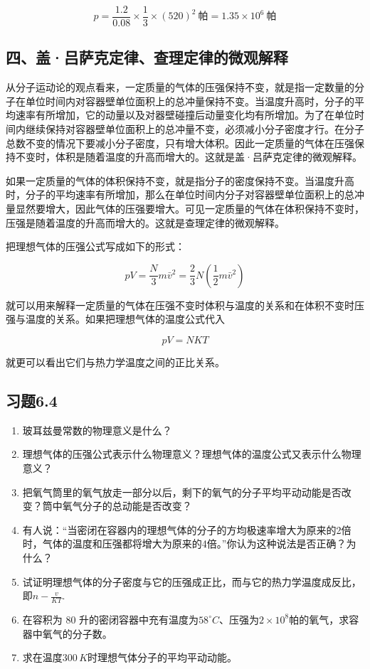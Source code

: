 \[
p=\frac{1.2}{0.08}\times\frac13\times(520)^2\ \text{帕}=1.35\times10^6\ \text{帕}
\]

\subsection{四、盖·吕萨克定律、查理定律的微观解释}\label{ux56dbux76d6ux5415ux8428ux514bux5b9aux5f8bux67e5ux7406ux5b9aux5f8bux7684ux5faeux89c2ux89e3ux91ca}

从分子运动论的观点看来，一定质量的气体的压强保持不变，就是指一定数量的分子在单位时间内对容器壁单位面积上的总冲量保持不变。当温度升高时，分子的平均速率有所增加，它的动量以及对器壁碰撞后动量变化均有所增加。为了在单位时间内继续保持对容器壁单位面积上的总冲量不变，必须减小分子密度才行。在分子总数不变的情况下要减小分子密度，只有增大体积。因此一定质量的气体在压强保持不变时，体积是随着温度的升高而增大的。这就是盖·吕萨克定律的微观解释。

如果一定质量的气体的体积保持不变，就是指分子的密度保持不变。当温度升高时，分子的平均速率有所增加，那么在单位时间内分子对容器壁单位面积上的总冲量显然要增大，因此气体的压强要增大。可见一定质量的气体在体积保持不变时，压强是随着温度的升高而增大的。这就是查理定律的微观解释。

把理想气体的压强公式写成如下的形式：

\[
p V = \frac {N}{3} m \bar {v} ^ {2} = \frac {2}{3} N \left(\frac {1}{2} m \bar {v} ^ {2}\right)
\]

就可以用来解释一定质量的气体在压强不变时体积与温度的关系和在体积不变时压强与温度的关系。如果把理想气体的温度公式代入

\[
p V = N K T
\]

就更可以看出它们与热力学温度之间的正比关系。

\subsection{习题6.4}\label{ux4e60ux98986.4}

\begin{enumerate}
\def\labelenumi{\arabic{enumi}.}
\item
  玻耳兹曼常数的物理意义是什么？
\item
  理想气体的压强公式表示什么物理意义？理想气体的温度公式又表示什么物理意义？
\item
  把氧气筒里的氧气放走一部分以后，剩下的氧气的分子平均平动动能是否改变？筒中氧气分子的总动能是否改变？
\item
  有人说：``当密闭在容器内的理想气体的分子的方均极速率增大为原来的2倍时，气体的温度和压强都将增大为原来的4倍。''你认为这种说法是否正确？为什么？
\item
  试证明理想气体的分子密度与它的压强成正比，而与它的热力学温度成反比，即\(n - \frac{v}{K T}\).
\item
  在容积为 80
  升的密闭容器中充有温度为\(58^{\circ}C\)、压强为\(2 \times 10^{8}\)帕的氧气，求容器中氧气的分子数。
\item
  求在温度\(300 \, K\)时理想气体分子的平均平动动能。
\end{enumerate}

